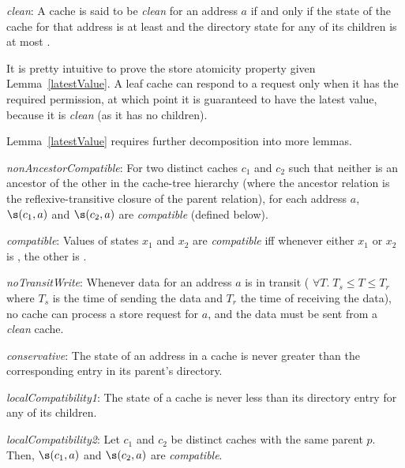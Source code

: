 \vspace{-.15in}

\begin{defn}
\textit{clean}: A cache is said to be \textit{clean} for an address $a$ if and only if
the state of the cache for that address is at least \Sh{} and the directory 
state for any of its children is at most \Sh.
\label{clean}
\end{defn}

It is pretty intuitive to prove the store atomicity property given
Lemma~\ref{latestValue}. A leaf cache can respond to a request only when it
has the required permission, at which point it is guaranteed to have the latest
value, because it is \textit{clean} (as it has no children).

Lemma~\ref{latestValue} requires further decomposition into more
lemmas.

\begin{lemma}
\textit{nonAncestorCompatible}: For two distinct caches $c_1$ and $c_2$ such
that neither is an ancestor of the other in the cache-tree hierarchy (where
the ancestor relation is the reflexive-transitive closure of the parent relation),
for each address $a$, $\s(c_1,a)$ and $\s(c_2,a)$ are
\textit{compatible} (defined below).
\label{nonAncestorCompatible}
\end{lemma}
\begin{defn}
\textit{compatible}: Values of states $x_1$ and $x_2$ are \textit{compatible}
iff whenever either $x_1$ or $x_2$ is \Mo{}, the other is \In.
\label{compatible}
\end{defn}

\begin{lemma}
\textit{noTransitWrite}: Whenever data for an address $a$ is in transit (\ie{}
$\forall T. \; T_s \le T \le T_r$ where $T_s$ is the time of sending the data and
$T_r$ the time of receiving the data), no cache can process a store request for
$a$, and the data must be sent from a \textit{clean} cache.
\label{noTransitWrite}
\end{lemma}

\begin{lemma}
\textit{conservative}: The state of an address in a cache is never greater than
the corresponding entry in its parent's directory.
\label{conservative}
\end{lemma}

\begin{lemma}
\textit{localCompatibility1}:
The state of a cache is never less than its directory entry for any of
its children.
\label{localCompatibility1}
\end{lemma}
\begin{lemma}
\textit{localCompatibility2}: Let $c_1$ and $c_2$ be distinct caches with the
same parent $p$. Then, $\s(c_1, a)$ and $\s(c_2, a)$ are
\textit{compatible}.
\label{localCompatibility2}
\end{lemma}

